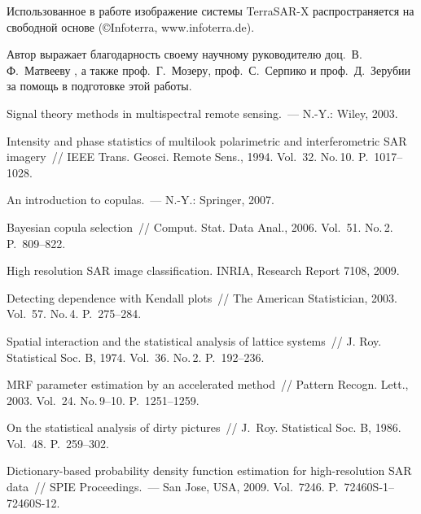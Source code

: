 \begin{multicols}{2}
\smallskip
Использованное в работе изображение системы TerraSAR-X распространяется на свободной 
основе (\copyright Infoterra, {\sf www.infoterra.de}).

\bigskip
Автор выражает благодарность своему научному руководителю доц.\
В.\,Ф.~Матвееву , а также проф.\ Г.~Мозеру, проф.\ С.~Серпико и проф.\
Д.~Зерубии за помощь в подготовке этой работы.


{\small\frenchspacing
{%
\begin{thebibliography}{99}

Signal theory methods in multispectral remote sensing.~--- N.-Y.: Wiley, 2003.

\bibitem{2DNG}
Intensity and phase statistics of multilook polarimetric and
interferometric SAR imagery~// IEEE Trans. Geosci. Remote Sens.,
1994. Vol.~32. No.\,10. P.~1017--1028.

An introduction to copulas.~--- N.-Y.: Springer, 2007.

 Bayesian copula
selection~// Comput. Stat. Data Anal., 2006. Vol.~51. No.\,2.
P.~809--822.

High resolution SAR image classification.
INRIA, Research Report 7108, 2009.

 Detecting dependence with Kendall
plots~// The American Statistician, 2003. Vol.~57. No.\,4.
P.~275--284.

 Spatial interaction and the statistical analysis
of lattice systems~// J. Roy. Statistical Soc. B,
1974. Vol.~36. No.\,2. P.~192--236.

MRF parameter estimation by an accelerated method~// Pattern Recogn. Lett., 2003. Vol.~24.
No.\,9--10. P.~1251--1259.

 On the statistical analysis of dirty pictures~//
J.~Roy. Statistical Soc. B, 1986. Vol.~48. P.~259--302.

 \label{end\stat}

Dictionary-based probability density function estimation for
high-resolution SAR data~// SPIE Proceedings.~--- San Jose, USA,
2009. Vol.~7246. P.~72460S-1--72460S-12.
 \end{thebibliography}
}
}


\end{multicols}